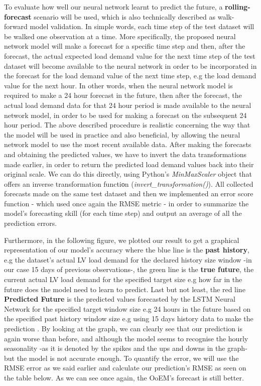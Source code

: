 \par To evaluate how well our neural network learnt to predict the future, a \textbf{rolling-forecast} scenario will be used, which is also technically described as walk-forward model validation. In simple words, each time step of the test dataset will be walked one observation at a time. More specifically, the proposed neural network model will make a forecast for a specific time step and then, after the forecast, the actual expected load demand value for the next time step of the test dataset will become available to the neural network in order to be incorporated in the forecast for the load demand value of the next time step, e.g the load demand value for the next hour. In other words, when the neural network model is required to make a 24 hour forecast in the future, then after the forecast, the actual load demand data for that 24 hour period is made available to the neural network model, in order to be used for making a forecast on the subsequent 24 hour period. The above described procedure is realistic concerning the way that the model will be used in practice and also beneficial, by allowing the neural network model to use the most recent available data. After making the forecasts and obtaining the predicted values, we have to invert the data transformations made earlier, in order to return the predicted load demand values back into their original scale. We can do this directly, using Python's \textit{MinMaxScaler} object that offers an inverse transformation functiοn (\textit{invert\_transformation()}). All collected forecasts made on the same test dataset and then we implemented an error score function - which used once again the RMSE metric - in order to summarize the model's forecasting skill (for each time step) and output an average of all the prediction errors. 
\par Furthermore, in the following figure, we plotted our result to get a graphical representation of our model's accuracy where the blue line is the \textbf{past history}, e.g the dataset's actual LV load demand for the declared history size window -in our case 15 days of previous observations-, the green line is the \textbf{true future}, the current actual LV load demand for the specified target size e.g how far in the future does the model need to learn to predict. Last but not least, the red line \textbf{Predicted Future} is the predicted values forecasted by the LSTM Neural Network for the specified target window size e.g 24 hours in the future based on the specified past history window size e.g using 15 days history data to make the prediction \cite{tensor}. By looking at the graph, we can clearly see that our prediction is again worse than before, and although the model seems to recognise the hourly seasonality -as it is denoted by the spikes and the ups and downs in the graph- but the model is not accurate enough. To quantify the error, we will use the RMSE error as we said earlier and calculate our prediction's RMSE as seen on the table below. As we can see once again, the OoEM's forecast is still better.
